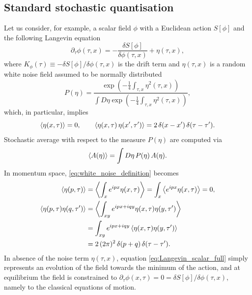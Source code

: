 \subsection{Standard stochastic quantisation}
Let us consider, for example, a scalar field $\phi$ with a Euclidean action $S[\phi]$ and the following Langevin equation
\begin{equation}
    \partial_\tau \phi(\tau, x) = - \frac{\delta S[\phi]}{\delta \phi (\tau, x)} + \eta (\tau, x),
    \label{eq:Langevin_scalar_full}
\end{equation}
where $K_{\phi}(\tau) \equiv -\delta S[\phi]/\delta \phi (\tau, x)$ is the drift term and $\eta (\tau, x)$ is a random white noise field assumed to be normally distributed
\begin{equation*}
    P(\eta) = \frac{\exp\left(-\frac{1}{4}\int_{\tau,x} \eta^2(\tau, x)\right)}{\int D\eta \exp\left(-\frac{1}{4}\int_{\tau,x} \eta^2(\tau,x)\right)},
\end{equation*} 
which, in particular, implies
\begin{equation}
    \left\langle \eta(x,\tau) \right\rangle = 0, \qquad \left\langle \eta(x,\tau) \, \eta(x',\tau') \right\rangle = 2 \, \delta(x - x') \, \delta (\tau - \tau').
    \label{eq:white_noise_definition}
\end{equation}
Stochastic average with respect to the measure $P(\eta)$ are computed via 
\begin{equation*}
    \left\langle A(\eta) \right\rangle = \int D\eta \, P(\eta) \, A(\eta).
\end{equation*}
In momentum space, \eqref{eq:white_noise_definition} becomes
\begin{equation}
    \begin{aligned}
        \left\langle \eta(p,\tau) \right\rangle &= \left\langle \int_x e^{ipx}\eta(x,\tau) \right\rangle = \int_x \left\langle e^{ipx}\eta(x,\tau) \right\rangle = 0, \\
        \left\langle \eta(p,\tau)\eta(q,\tau') \right\rangle &= \left\langle \int_{xy} e^{ipx + iqy} \eta(x,\tau)\eta(y,\tau') \right\rangle \\
        &= \int_{xy} e^{ipx + iqy} \left\langle \eta(x,\tau)\eta(y,\tau') \right\rangle \\
        &= 2 \, (2\pi)^2 \, \delta(p + q) \, \delta(\tau - \tau').
    \end{aligned}
    \label{eq:white_noise_definition_momentum}
\end{equation}
In absence of the noise term $\eta(\tau,x)$, equation \eqref{eq:Langevin_scalar_full} simply represents an evolution of the field towards the minimum of the action, and at equilibrium the field is constrained to $\partial_\tau \phi(x,\tau) = 0 = \delta S[\phi]/\delta \phi (\tau, x)$, namely to the classical equations of motion.\\
